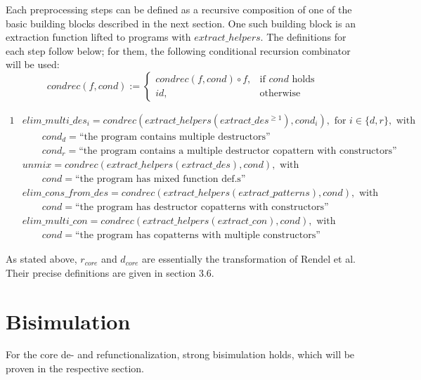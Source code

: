 Each preprocessing steps can be defined as a recursive composition of one of the basic building blocks described in the next section. One such building block is an extraction function lifted to programs with $extract\_helpers$. The definitions for each step follow below; for them, the following conditional recursion combinator will be used:
\[
    condrec(f, cond) :=
\begin{cases}
    condrec(f, cond) \circ f,& \text{if $cond$ holds} \\
   id,& \text{otherwise}
\end{cases}
\]

\begin{framed}

\begin{alignat*}{1}
&elim\_multi\_des_i = condrec(extract\_helpers(extract\_des^{\geq 1}), cond_i), \textrm{ for } i \in \{d, r\}, \textrm{ with } \\
&\qquad cond_d = \textrm{``the program contains multiple destructors''} \\
&\qquad cond_r = \textrm{``the program contains a multiple destructor copattern with constructors''} \\
&unmix = condrec(extract\_helpers(extract\_des), cond), \textrm{ with}\\
&\qquad cond = \textrm{``the program has mixed function def.s''} \\
&elim\_cons\_from\_des = condrec(extract\_helpers(extract\_patterns), cond), \textrm{ with}\\
&\qquad cond = \textrm{``the program has destructor copatterns with constructors''} \\
&elim\_multi\_con = condrec(extract\_helpers(extract\_con), cond), \textrm{ with}\\
&\qquad cond = \textrm{``the program has copatterns with multiple constructors''}
\end{alignat*}

\end{framed}

As stated above, $r_{core}$ and $d_{core}$ are essentially the transformation of Rendel et al. Their precise definitions are given in section 3.6.

\section{Bisimulation}

For the core de- and refunctionalization, strong bisimulation holds, which will be proven in the respective section.

